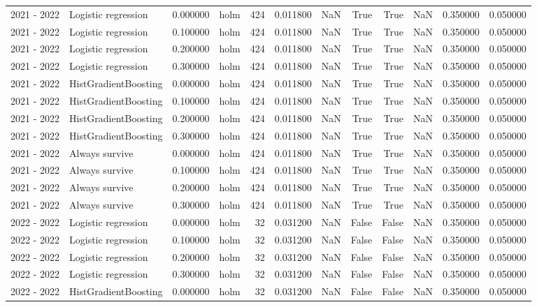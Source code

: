 \begin{tabular}{llrlrrrrrrrr}
2021 - 2022 & Logistic regression & 0.000000 & holm & 424 & 0.011800 & NaN & True & True & NaN & 0.350000 & 0.050000 \\
2021 - 2022 & Logistic regression & 0.100000 & holm & 424 & 0.011800 & NaN & True & True & NaN & 0.350000 & 0.050000 \\
2021 - 2022 & Logistic regression & 0.200000 & holm & 424 & 0.011800 & NaN & True & True & NaN & 0.350000 & 0.050000 \\
2021 - 2022 & Logistic regression & 0.300000 & holm & 424 & 0.011800 & NaN & True & True & NaN & 0.350000 & 0.050000 \\
2021 - 2022 & HistGradientBoosting & 0.000000 & holm & 424 & 0.011800 & NaN & True & True & NaN & 0.350000 & 0.050000 \\
2021 - 2022 & HistGradientBoosting & 0.100000 & holm & 424 & 0.011800 & NaN & True & True & NaN & 0.350000 & 0.050000 \\
2021 - 2022 & HistGradientBoosting & 0.200000 & holm & 424 & 0.011800 & NaN & True & True & NaN & 0.350000 & 0.050000 \\
2021 - 2022 & HistGradientBoosting & 0.300000 & holm & 424 & 0.011800 & NaN & True & True & NaN & 0.350000 & 0.050000 \\
2021 - 2022 & Always survive & 0.000000 & holm & 424 & 0.011800 & NaN & True & True & NaN & 0.350000 & 0.050000 \\
2021 - 2022 & Always survive & 0.100000 & holm & 424 & 0.011800 & NaN & True & True & NaN & 0.350000 & 0.050000 \\
2021 - 2022 & Always survive & 0.200000 & holm & 424 & 0.011800 & NaN & True & True & NaN & 0.350000 & 0.050000 \\
2021 - 2022 & Always survive & 0.300000 & holm & 424 & 0.011800 & NaN & True & True & NaN & 0.350000 & 0.050000 \\
2022 - 2022 & Logistic regression & 0.000000 & holm & 32 & 0.031200 & NaN & False & False & NaN & 0.350000 & 0.050000 \\
2022 - 2022 & Logistic regression & 0.100000 & holm & 32 & 0.031200 & NaN & False & False & NaN & 0.350000 & 0.050000 \\
2022 - 2022 & Logistic regression & 0.200000 & holm & 32 & 0.031200 & NaN & False & False & NaN & 0.350000 & 0.050000 \\
2022 - 2022 & Logistic regression & 0.300000 & holm & 32 & 0.031200 & NaN & False & False & NaN & 0.350000 & 0.050000 \\
2022 - 2022 & HistGradientBoosting & 0.000000 & holm & 32 & 0.031200 & NaN & False & False & NaN & 0.350000 & 0.050000 \\

\end{tabular}
